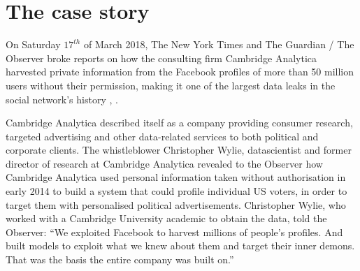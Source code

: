 \documentclass[11pt, twoside]{report}
\begin{document}
    
    \tableofcontents
    \chapter{The case story}

On Saturday $17^{th}$ of March 2018, The New York Times and The Guardian / The Observer broke reports on how the consulting firm Cambridge Analytica harvested private information from the Facebook profiles of more than 50 million users without their permission, making it one of the largest data leaks in the social network’s history \cite{guardian}, \cite{nyt_17march}.

Cambridge Analytica described itself as a company providing consumer research, targeted advertising and other data-related services to both political and corporate clients. The whistleblower Christopher Wylie, datascientist and former director of research at Cambridge Analytica revealed to the Observer how Cambridge Analytica used personal information taken without authorisation in early 2014 to build a system that could profile individual US voters, in order to target them with personalised political advertisements.
Christopher Wylie, who worked with a Cambridge University academic to obtain the data, told the Observer: “We exploited Facebook to harvest millions of people’s profiles. And built models to exploit what we knew about them and target their inner demons. That was the basis the entire company was built on.”
\end{document}
